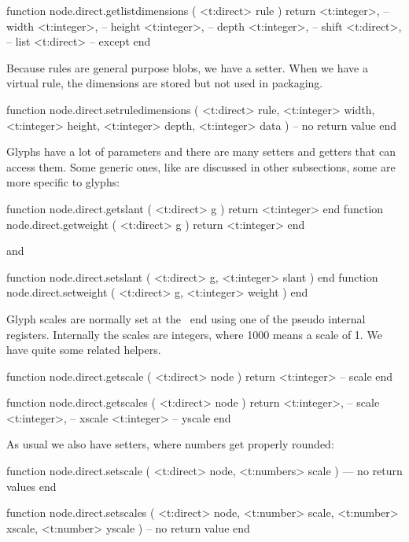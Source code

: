 \starttyping[option=LUA]
function node.direct.getlistdimensions ( <t:direct> rule )
    return
        <t:integer>, -- width
        <t:integer>, -- height
        <t:integer>, -- depth
        <t:integer>, -- shift
        <t:direct>,  -- list
        <t:direct>   -- except
end
\stoptyping

Because rules are general purpose blobs, we have a setter. When we have a
virtual rule, the dimensions are stored but not used in packaging.

\starttyping[option=LUA]
function node.direct.setruledimensions (
    <t:direct>  rule,
    <t:integer> width,
    <t:integer> height,
    <t:integer> depth,
    <t:integer> data
)
    -- no return value
end
\stoptyping

\stopsubsection

\startsubsection[title={Glyphs}]

Glyphs have a lot of parameters and there are many setters and getters that
can access them. Some generic ones, like  are discussed
in other subsections, some are more specific to glyphs:

\starttyping[option=LUA]
function node.direct.getslant  ( <t:direct> g ) return <t:integer> end
function node.direct.getweight ( <t:direct> g ) return <t:integer> end
\stoptyping

and

\starttyping[option=LUA]
function node.direct.setslant  ( <t:direct> g, <t:integer> slant  ) end
function node.direct.setweight ( <t:direct> g, <t:integer> weight ) end
\stoptyping

Glyph scales are normally set at the \TEX\ end using one of the pseudo internal
registers. Internally the scales are integers, where 1000 means a scale of 1. We
have quite some related helpers.

\starttyping[option=LUA]
function node.direct.getscale (
    <t:direct> node
)
    return <t:integer> -- scale
end

function node.direct.getscales (
    <t:direct> node
)
    return
        <t:integer>, -- scale
        <t:integer>, -- xscale
        <t:integer>  -- yscale
end
\stoptyping

As usual we also have setters, where numbers get properly rounded:

\starttyping[option=LUA]
function node.direct.setscale   (
    <t:direct>  node,
    <t:numbers> scale
)
    --- no return values
end

function node.direct.setscales (
    <t:direct> node,
    <t:number> scale,
    <t:number> xscale,
    <t:number> yscale
)
    -- no return value
end
\stoptyping

